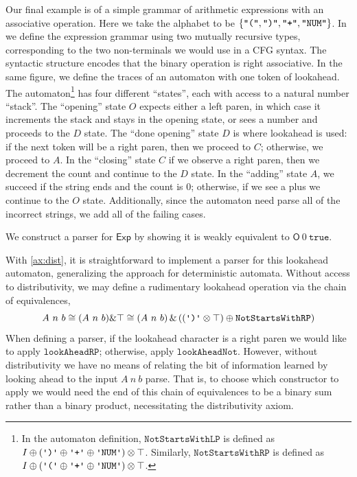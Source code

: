 \documentclass[acmsmall,nonacm]{acmart}
\newcommand{\true}{\mathtt{true}}
\newcommand{\literal}[1]{\texttt{\textquotesingle#1\textquotesingle}}
\newcommand{\stringquote}[1]{\texttt{\textquotedbl#1\textquotedbl}}
\newcommand{\agdalogo}{%
  \usebox{\logoagdabox}}%
\newcommand{\zenodolink}{https://zenodo.org/records/15049780}
\newcommand{\Agda}{\href{\zenodolink}{\agdalogo}}
\begin{document}
Our final example is of a simple grammar of arithmetic expressions
with an associative operation. Here we take the alphabet to be $\{
\stringquote{(}, \stringquote{)}, \stringquote{+} , \stringquote{NUM}
\}$. In  we define the expression grammar
using two mutually
recursive types, corresponding to the two non-terminals we would use
in a CFG syntax. The syntactic structure encodes that the binary
operation is right associative. In the same figure, we define the
traces of an automaton with one token of lookahead. The automaton\footnote{In
  the automaton definition,
  $\texttt{NotStartsWithLP}$ is defined as
  \(I \oplus
  (\literal{)} \oplus \literal{+} \oplus \literal{NUM}) \otimes \top
  \). Similarly,
  $\texttt{NotStartsWithRP}$ is defined as
  \(I \oplus
  (\literal{(} \oplus \literal{+} \oplus \literal{NUM}) \otimes \top
  \).
}
has four different ``states'', each with access to a natural number
``stack''. The ``opening'' state $O$ expects either a left paren, in
which case it increments the stack and stays in the opening state, or
sees a number and proceeds to the $D$ state. The ``done opening''
state $D$ is where lookahead is used: if the next token will be a
right paren, then we proceed to $C$; otherwise, we proceed to $A$.
In the ``closing'' state $C$ if
we observe a right paren, then we decrement the count and continue to the
$D$ state. In the ``adding'' state $A$, we succeed if the string
ends and the count is $0$; otherwise, if we see a plus we continue to the $O$
state. Additionally, since the automaton need parse all of the
incorrect strings, we add all of the failing cases.

\begin{theorem}[\Agda]
  \label{thm:exp-parser}
  We construct a parser for $\mathsf{Exp}$ by showing it is weakly
  equivalent to $\mathsf{O}~0~\true$.
\end{theorem}

With \cref{ax:dist}, it is straightforward to implement a parser for this lookahead automaton,
generalizing the approach for deterministic automata. Without access to
distributivity, we may define a rudimentary lookahead operation via the chain of
equivalences,
\[
  A~n~b \cong (A~n~b) \& \top \cong (A~n~b)\,\& \left(\left(\literal{)} \otimes \top \right) \oplus \texttt{NotStartsWithRP}\right)
\]
When defining a parser, if the lookahead character is a right paren we would
like to apply $\texttt{lookAheadRP}$; otherwise, apply $\texttt{lookAheadNot}$.
However, without distributivity we have no means of relating the bit of
information learned by looking ahead to the input $A~n~b$ parse.
That is, to choose which constructor to apply we would need the end of this
chain of equivalences to be a binary sum rather than a binary product,
necessitating the distributivity axiom.
\end{document}
